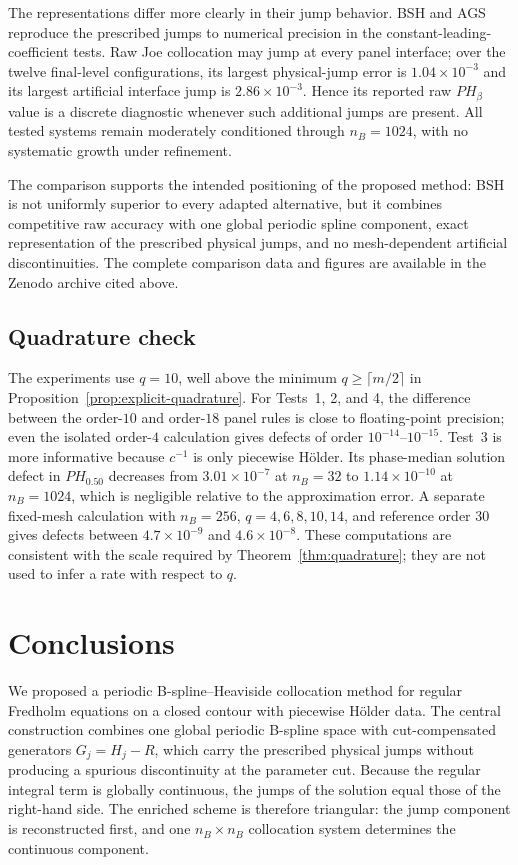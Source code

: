 \documentclass[11pt,a4paper]{amsart}
\theoremstyle{plain}
\theoremstyle{definition}
\theoremstyle{remark}
\begin{document}
The representations differ more clearly in their jump behavior.  BSH and
AGS reproduce the prescribed jumps to numerical precision in the
constant-leading-coefficient tests.  Raw Joe collocation may jump at every
panel interface; over the twelve final-level configurations, its largest
physical-jump error is $1.04\times10^{-3}$ and its largest artificial
interface jump is $2.86\times10^{-3}$.  Hence its reported raw
$PH_\beta$ value is a discrete diagnostic whenever such additional jumps
are present.  All tested systems remain moderately conditioned through
$n_B=1024$, with no systematic growth under refinement.

The comparison supports the intended positioning of the proposed method:
BSH is not uniformly superior to every adapted alternative, but it combines
competitive raw accuracy with one global periodic spline component, exact
representation of the prescribed physical jumps, and no mesh-dependent
artificial discontinuities.  The complete comparison data and figures are
available in the Zenodo archive cited above.


\subsection{Quadrature check}

The experiments use $q=10$, well above the minimum
$q\ge\lceil m/2\rceil$ in Proposition~\ref{prop:explicit-quadrature}.
For Tests~1, 2, and 4, the difference between the order-$10$ and order-$18$
panel rules is close to floating-point precision; even the isolated
order-$4$ calculation gives defects of order $10^{-14}$--$10^{-15}$.
Test~3 is more informative because $c^{-1}$ is only piecewise H\"older.
Its phase-median solution defect in $PH_{0.50}$ decreases from
$3.01\times10^{-7}$ at $n_B=32$ to $1.14\times10^{-10}$ at $n_B=1024$,
which is negligible relative to the approximation error.  A separate
fixed-mesh calculation with $n_B=256$, $q=4,6,8,10,14$, and reference order
$30$ gives defects between $4.7\times10^{-9}$ and $4.6\times10^{-8}$.
These computations are consistent with the scale required by Theorem~\ref{thm:quadrature}; they are not used to infer a rate with respect
to $q$.


\section{Conclusions}\label{sec:conclusions}

We proposed a periodic B-spline--Heaviside collocation method for regular
Fredholm equations on a closed contour with piecewise H\"older data.  The
central construction combines one global periodic B-spline space with
cut-compensated generators $G_j=H_j-R$, which carry the prescribed physical
jumps without producing a spurious discontinuity at the parameter cut.
Because the regular integral term is globally continuous, the jumps of the
solution equal those of the right-hand side.  The enriched scheme is
therefore triangular: the jump component is reconstructed first, and one
$n_B\times n_B$ collocation system determines the continuous component.
\end{document}

